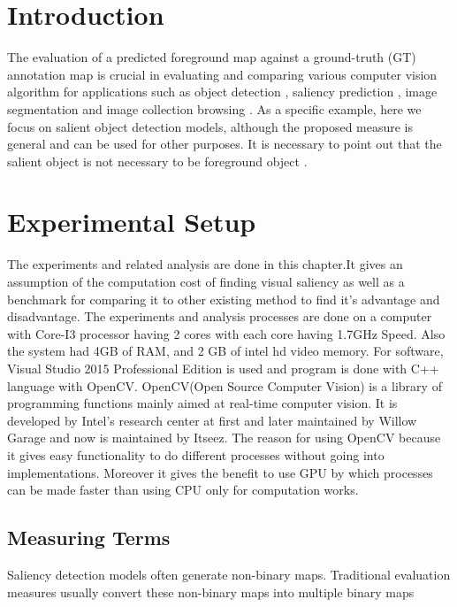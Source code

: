 \section{Introduction}
The evaluation of a predicted foreground map against a
ground-truth (GT) annotation map is crucial in evaluating
and comparing various computer vision algorithm for applications such as object detection\cite{borji2015salient,bylinskii2015saliency,kanan2010robust,qi2015saliencyrank} , saliency
prediction \cite{borji2014salient,hou2017deeply,jiang2013salient}, image segmentation and image collection browsing . As a
specific example, here we focus on salient object detection
models, although the proposed measure is general and can be used for other purposes. It is necessary to point out that the salient object is not necessary to be foreground object \cite{feng2016local}.

\section{Experimental Setup}

The experiments and related analysis are done in this chapter.It gives an assumption of the computation cost of finding visual saliency as well as a benchmark for comparing it to other existing method to find it's advantage and disadvantage. 
The experiments and analysis processes are done on a computer with Core-I3 processor having 2 cores with each core having 1.7GHz Speed. Also the system had 4GB of RAM, and 2 GB of intel hd video memory.
For software, Visual Studio 2015 Professional Edition is used and program is done with C++ language with OpenCV. OpenCV(Open Source Computer Vision) is a library of programming functions mainly aimed at real-time computer vision. It is developed by Intel’s research center at first and later maintained by Willow Garage and now is maintained by Itseez.
The reason for using OpenCV because it gives easy functionality to do different processes without going into implementations. Moreover it gives the benefit to use GPU by which processes can be made faster than using CPU only for computation works.

\subsection{Measuring Terms}

Saliency detection models often generate non-binary
maps. Traditional evaluation measures usually convert
these non-binary maps into multiple binary maps
